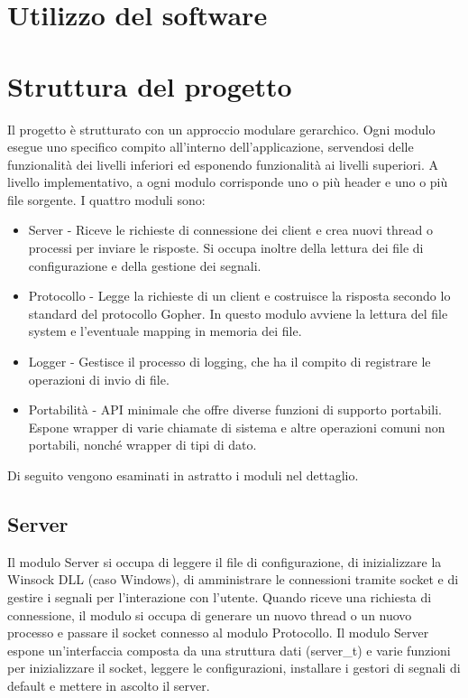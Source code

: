 \documentclass{article}
\begin{document}
\tableofcontents

\section{Utilizzo del software}

\newpage

\section{Struttura del progetto}

Il progetto è strutturato con un approccio modulare gerarchico. 
Ogni modulo esegue uno specifico compito all'interno dell'applicazione, servendosi delle funzionalità
dei livelli inferiori ed esponendo funzionalità ai livelli superiori.
A livello implementativo, a ogni modulo corrisponde uno o più header e uno o più file sorgente.
I quattro moduli sono:
\begin{itemize}
    \item Server - Riceve le richieste di connessione dei client e crea nuovi thread 
    o processi per inviare le risposte. Si occupa inoltre della lettura dei file di configurazione e 
    della gestione dei segnali.
    \item Protocollo - Legge la richieste di un client e costruisce la risposta secondo lo standard del
    protocollo Gopher. In questo modulo avviene la lettura del file system e l'eventuale mapping 
    in memoria dei file.
    \item Logger - Gestisce il processo di logging, che ha il compito di registrare le operazioni di invio
    di file.
    \item Portabilità - API minimale che offre diverse funzioni di supporto portabili. Espone wrapper
    di varie chiamate di sistema e altre operazioni comuni non portabili, nonché wrapper di tipi di dato.
\end{itemize} 
Di seguito vengono esaminati in astratto i moduli nel dettaglio.

\subsection{Server}
Il modulo Server si occupa di leggere il file di configurazione, di inizializzare la Winsock DLL 
(caso Windows), di amministrare le connessioni tramite socket e di gestire i 
segnali per l'interazione con l'utente.
Quando riceve una richiesta di connessione, il modulo si occupa di generare un nuovo thread o un nuovo processo
e passare il socket connesso al modulo Protocollo.
Il modulo Server espone un'interfaccia composta da una struttura dati (server\_t) e
varie funzioni per inizializzare il socket, leggere le configurazioni, installare i 
gestori di segnali di default e mettere in ascolto il server.  
\end{document}
